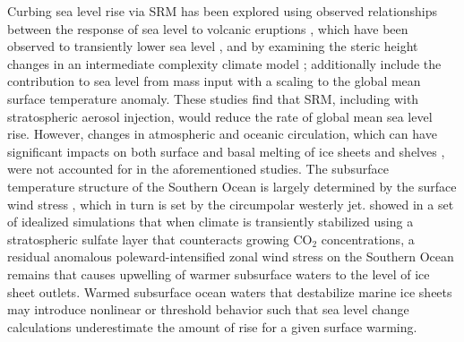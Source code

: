 \documentclass[draft,grl]{AGUTeX}  %
\begin{document}
\begin{article}
Curbing sea level rise via SRM has been explored using observed relationships between the response of sea level to volcanic eruptions \citep{moore10}, which have been observed to transiently lower sea level \citep{church05,gleckler06}, and by examining the steric height changes in an intermediate complexity climate model \citep{irvine12}; \citet{irvine12} additionally include the contribution to sea level from mass input with a scaling to the global mean surface temperature anomaly. These studies find that SRM, including with stratospheric aerosol injection, would reduce the rate of global mean sea level rise. However, changes in atmospheric and oceanic circulation, which can have significant impacts on both surface and basal melting of ice sheets and shelves \citep{steig13,joughin11,thoma08}, were not accounted for in the aforementioned studies. The subsurface temperature structure of the Southern Ocean is largely determined by the surface wind stress \citep{fyfe07}, which in turn is set by the circumpolar westerly jet. \citet{mccusker12} showed in a set of idealized simulations that when climate is transiently stabilized using a stratospheric sulfate layer that counteracts growing CO$_2$ concentrations, a residual anomalous poleward-intensified zonal wind stress on the Southern Ocean remains that causes upwelling of warmer subsurface waters to the level of ice sheet outlets. Warmed subsurface ocean waters that destabilize marine ice sheets may introduce nonlinear or threshold behavior \citep{notz09} such that sea level change calculations underestimate the amount of rise for a given surface warming.



\end{article}
\end{document}
